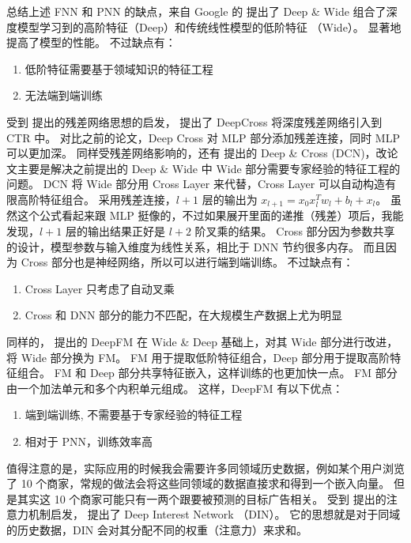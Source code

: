 \documentclass[degree=project,degree-type=project,cjk-font=noto]{thuthesis}
\begin{document}
总结上述 FNN 和 PNN 的缺点，来自 Google 的 \cite{deep_wide} 提出了 Deep \& Wide 组合了深度模型学习到的高阶特征（Deep）和传统线性模型的低阶特征 （Wide）。
显著地提高了模型的性能。
不过缺点有：

\begin{enumerate}
  \item 低阶特征需要基于领域知识的特征工程
  \item 无法端到端训练
\end{enumerate}

受到 \cite{resnet} 提出的残差网络思想的启发，\cite{deep_cross} 提出了 DeepCross 将深度残差网络引入到 CTR 中。
对比之前的论文，Deep Cross 对 MLP 部分添加残差连接，同时 MLP 可以更加深。
同样受残差网络影响的，还有 \cite{dcn} 提出的 Deep \& Cross (DCN)，改论文主要是解决之前提出的 Deep \& Wide 中 Wide 部分需要专家经验的特征工程的问题。
DCN 将 Wide 部分用 Cross Layer 来代替，Cross Layer 可以自动构造有限高阶特征组合。
采用残差连接，$l + 1$ 层的输出为 $x_{l+1} = x_0 x_l^T w_l + b_l + x_l$。
虽然这个公式看起来跟 MLP 挺像的，不过如果展开里面的递推（残差）项后，我能发现，$l + 1 $ 层的输出结果正好是 $l + 2$ 阶叉乘的结果。
Cross 部分因为参数共享的设计，模型参数与输入维度为线性关系，相比于 DNN 节约很多内存。
而且因为 Cross 部分也是神经网络，所以可以进行端到端训练。
不过缺点有：

\begin{enumerate}
  \item Cross Layer 只考虑了自动叉乘
  \item Cross 和 DNN 部分的能力不匹配，在大规模生产数据上尤为明显
\end{enumerate}

同样的，\cite{deepfm} 提出的 DeepFM 在 Wide \& Deep 基础上，对其 Wide 部分进行改进，将 Wide 部分换为 FM。
FM 用于提取低阶特征组合，Deep 部分用于提取高阶特征组合。
FM 和 Deep 部分共享特征嵌入，这样训练的也更加快一点。
FM 部分由一个加法单元和多个内积单元组成。
这样，DeepFM 有以下优点：

\begin{enumerate}
  \item 端到端训练, 不需要基于专家经验的特征工程
  \item 相对于 PNN，训练效率高
\end{enumerate}

值得注意的是，实际应用的时候我会需要许多同领域历史数据，例如某个用户浏览了 10 个商家，常规的做法会将这些同领域的数据直接求和得到一个嵌入向量。
但是其实这 10 个商家可能只有一两个跟要被预测的目标广告相关。
受到 \cite{attention} 提出的注意力机制启发，\cite{din} 提出了 Deep Interest Network （DIN）。
它的思想就是对于同域的历史数据，DIN 会对其分配不同的权重（注意力）来求和。
\end{document}
